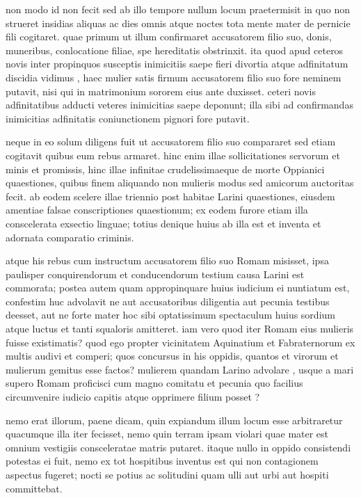  non modo id non fecit sed ab illo tempore nullum locum praetermisit in quo non strueret insidias aliquas ac dies omnis atque noctes tota mente mater de pernicie fili cogitaret. quae primum ut illum confirmaret accusatorem filio suo, donis, muneribus, conlocatione filiae, spe hereditatis obstrinxit. ita quod apud ceteros novis inter propinquos susceptis inimicitiis saepe fieri divortia atque adfinitatum discidia vidimus , haec mulier satis firmum accusatorem filio suo fore neminem putavit, nisi qui in matrimonium sororem eius ante duxisset. ceteri novis adfinitatibus adducti veteres inimicitias saepe deponunt; illa sibi ad confirmandas inimicitias adfinitatis coniunctionem pignori fore putavit.

 neque in eo solum diligens fuit ut accusatorem filio suo compararet sed etiam cogitavit quibus eum rebus armaret. hinc enim illae sollicitationes servorum et minis et promissis, hinc illae infinitae crudelissimaeque de morte Oppianici quaestiones, quibus finem aliquando non mulieris modus sed amicorum auctoritas fecit. ab eodem scelere illae triennio post habitae Larini quaestiones, eiusdem amentiae falsae conscriptiones quaestionum; ex eodem furore etiam illa conscelerata exsectio linguae; totius denique huius ab illa est et inventa et adornata comparatio criminis.

 atque his rebus cum instructum accusatorem filio suo Romam misisset, ipsa paulisper conquirendorum et conducendorum testium causa Larini est commorata; postea autem quam appropinquare huius iudicium ei nuntiatum est, confestim huc advolavit ne aut accusatoribus diligentia aut pecunia testibus deesset, aut ne forte mater hoc sibi optatissimum spectaculum huius sordium atque luctus et tanti squaloris amitteret. iam vero quod iter Romam eius mulieris fuisse existimatis? quod ego propter vicinitatem Aquinatium et Fabraternorum ex multis audivi et comperi; quos concursus in his oppidis, quantos et virorum et mulierum gemitus esse factos? mulierem quandam Larino advolare , usque a mari supero Romam proficisci cum magno comitatu et pecunia quo facilius circumvenire iudicio capitis atque opprimere filium posset ?

 nemo erat illorum, paene dicam, quin expiandum illum locum esse arbitraretur quacumque illa iter fecisset, nemo quin terram ipsam violari quae mater est omnium vestigiis consceleratae matris putaret. itaque nullo in oppido consistendi potestas ei fuit, nemo ex tot hospitibus inventus est qui non contagionem aspectus fugeret; nocti se potius ac solitudini quam ulli aut urbi aut hospiti committebat.

